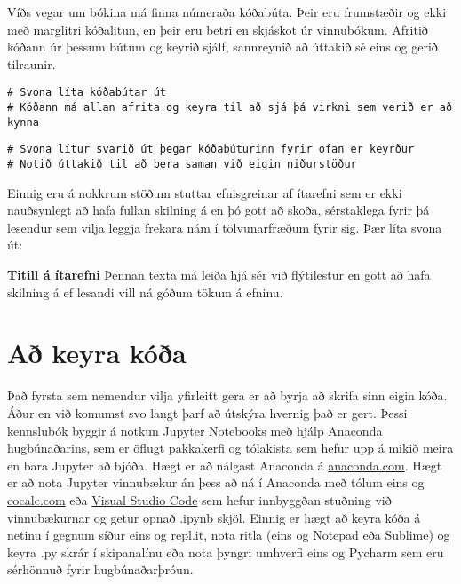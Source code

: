 Víðs vegar um bókina má finna númeraða kóðabúta.
Þeir eru frumstæðir og ekki með marglitri kóðalitun, en þeir eru betri en skjáskot úr vinnubókum.
Afritið kóðann úr þessum bútum og keyrið sjálf, sannreynið að úttakið sé eins og gerið tilraunir.
\lstset{style=uttak}
\lstset{style=venjulegt}
\begin{lstlisting}[caption=Kóðabútar kynntir til sögunnar]
# Svona líta kóðabútar út
# Kóðann má allan afrita og keyra til að sjá þá virkni sem verið er að kynna
\end{lstlisting}
\lstset{style=uttak}
\begin{lstlisting}
# Svona lítur svarið út þegar kóðabúturinn fyrir ofan er keyrður
# Notið úttakið til að bera saman við eigin niðurstöður
\end{lstlisting}
\lstset{style=venjulegt}

Einnig eru á nokkrum stöðum stuttar efnisgreinar af ítarefni sem er ekki nauðsynlegt að hafa fullan skilning á en þó gott að skoða, sérstaklega fyrir þá lesendur sem vilja leggja frekara nám í tölvunarfræðum fyrir sig.
Þær líta svona út:

\begin{itarefni}
\textbf{Titill á ítarefni}
Þennan texta má leiða hjá sér við flýtilestur en gott að hafa skilning á ef lesandi vill ná góðum tökum á efninu.
\end{itarefni}

\section{Að keyra kóða}\label{uk:keyra-koda}

Það fyrsta sem nemendur vilja yfirleitt gera er að byrja að skrifa sinn eigin kóða. 
Áður en við komumst svo langt þarf að útskýra hvernig það er gert. 
Þessi kennslubók byggir á notkun Jupyter Notebooks með hjálp Anaconda hugbúnaðarins, sem er öflugt pakkakerfi og tólakista sem hefur upp á mikið meira en bara Jupyter að bjóða. 
Hægt er að nálgast Anaconda á \href{www.anaconda.com}{anaconda.com}.
Hægt er að nota Jupyter vinnubækur án þess að ná í Anaconda með tólum eins og \href{www.cocalc.com}{cocalc.com} eða \href{https://code.visualstudio.com/}{Visual Studio Code} sem hefur innbyggðan stuðning við vinnubækurnar og getur opnað .ipynb skjöl. 
Einnig er hægt að keyra kóða á netinu í gegnum síður eins og \href{www.repl.it}{repl.it}, nota ritla (eins og Notepad eða Sublime) og keyra .py skrár í skipanalínu eða nota þyngri umhverfi eins og Pycharm sem eru sérhönnuð fyrir hugbúnaðarþróun.

